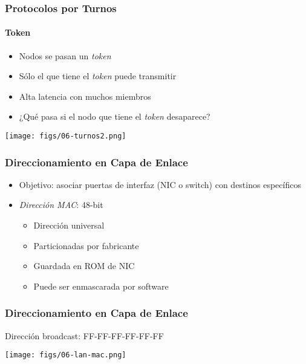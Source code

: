 \documentclass[letter]{beamer}
\begin{document}
\begin{frame}
  \frametitle{Protocolos por Turnos}
  \framesubtitle{Token}

  \begin{itemize}
    \item Nodos se pasan un {\em token}
    \item Sólo el que tiene el {\em token} puede transmitir
    \item Alta latencia con muchos miembros
    \item ¿Qué pasa si el nodo que tiene el {\em token} desaparece?
  \end{itemize}

  \begin{center}
    \texttt{[image: figs/06-turnos2.png]}
  \end{center}

\end{frame}
\begin{frame}
  \frametitle{Direccionamiento en Capa de Enlace}

  \begin{itemize}
    \item Objetivo: asociar puertas de interfaz (NIC o switch) con destinos específicos
    \item {\em Dirección MAC}: 48-bit
      \begin{itemize}
        \item Dirección universal
        \item Particionadas por fabricante
        \item Guardada en ROM de NIC
        \item Puede ser enmascarada por software
      \end{itemize}
  \end{itemize}


\end{frame}
\begin{frame}
  \frametitle{Direccionamiento en Capa de Enlace}

  Dirección broadcast: FF-FF-FF-FF-FF-FF
  \begin{center}
    \texttt{[image: figs/06-lan-mac.png]}
  \end{center}

\end{frame}
\end{document}
